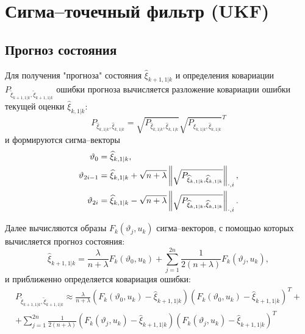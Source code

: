 \section{Сигма--точечный фильтр (UKF)}

\subsection{Прогноз состояния}

Для получения "прогноза"{} состояния $\widehat{\xi}_{k+1,1|k}$ и определения ковариации $P_{\widetilde{\xi}_{k+1,1|k}, \widetilde{\xi}_{k+1,1|k}}$ ошибки прогноза
вычисляется разложение ковариации ошибки текущей оценки $\widehat{\xi}_{k,1|k}$:
$$
    P_{\widehat{\xi}_{k,1|k}, \widehat{\xi}_{k,1|k}} = \sqrt{P_{\widehat{\xi}_{k,1|k}, \widehat{\xi}_{k,1|k}}} \sqrt{P_{\widehat{\xi}_{k,1|k}, \widehat{\xi}_{k,1|k}}}^T
$$
и формируются сигма--векторы
\begin{align*}
    \vartheta_0      & = \widehat{\xi}_{k,1|k} , \\
    \vartheta_{2i-1} & = \widehat{\xi}_{k,1|k} + \sqrt{n + \lambda} \left \| \sqrt{P_{\widehat{\xi}_{k,1|k}, \widehat{\xi}_{k,1|k}}} \right \|_{\cdot, i} , \\
    \vartheta_{2i}   & = \widehat{\xi}_{k,1|k} - \sqrt{n + \lambda} \left \| \sqrt{P_{\widehat{\xi}_{k,1|k}, \widehat{\xi}_{k,1|k}}} \right \|_{\cdot, i} .
\end{align*}

Далее вычисляются образы $F_k( \vartheta_j, u_k )$ сигма--векторов, с помощью которых вычисляется прогноз состояния:
$$
    \widehat{\xi}_{k+1,1|k} = \frac{\lambda}{n + \lambda} F_k( \vartheta_0, u_k ) + \sum_{j=1}^{2n} \frac{1}{2 (n + \lambda)} F_k ( \vartheta_j, u_k ) ,
$$
и приближенно определяется ковариация ошибки:
\begin{multline*}
    P_{\widetilde{\xi}_{k+1,1|k}, \widetilde{\xi}_{k+1,1|k}}
        \approx \frac{\lambda}{n + \lambda} \left ( F_k ( \vartheta_0, u_k ) - \widehat{\xi}_{k+1,1|k} \right ) \left ( F_k ( \vartheta_0, u_k ) - \widehat{\xi}_{k+1,1|k} \right )^T + \\
    + \sum_{j=1}^{2n} \frac{1}{2 (n + \lambda)} \left ( F_k ( \vartheta_j, u_k ) - \widehat{\xi}_{k+1,1|k} \right ) \left ( F_k ( \vartheta_j, u_k ) - \widehat{\xi}_{k+1,1|k} \right )^T
\end{multline*}